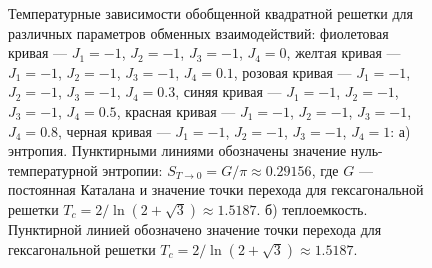 \documentclass[utf8,12pt]{jetp}
\begin{document}
\begin{figure}[h]
	\begin{minipage}[h]{0.5\linewidth}
	\end{minipage}
	\hfill
	\begin{minipage}[h]{0.5\linewidth}
	\end{minipage}
	\caption{Температурные зависимости обобщенной квадратной решетки для различных параметров обменных взаимодействий: фиолетовая кривая --- $J_1 = -1$, $J_2 = -1$, $J_3 = -1$, $J_4 = 0$, желтая кривая --- $J_1 = -1$, $J_2 = -1$, $J_3 = -1$, $J_4 = 0.1$, розовая кривая --- $J_1 = -1$, $J_2 = -1$, $J_3 = -1$, $J_4 = 0.3$, синяя кривая --- $J_1 = -1$, $J_2 = -1$, $J_3 = -1$, $J_4 = 0.5$, красная кривая --- $J_1 = -1$, $J_2 = -1$, $J_3 = -1$, $J_4 = 0.8$, черная кривая --- $J_1 = -1$, $J_2 = -1$, $J_3 = -1$, $J_4 = 1$: а) энтропия. Пунктирными линиями обозначены значение нуль-температурной энтропии: $S_{T\rightarrow 0} = G/\pi\approx 0.29156$, где $G$ --- постоянная Каталана и значение точки перехода для гексагональной решетки $T_c = 2/\ln(2+\sqrt{3})\approx 1.5187$. б) теплоемкость. Пунктирной линией обозначено значение точки перехода для гексагональной решетки $T_c = 2/\ln(2+\sqrt{3})\approx 1.5187$. }
	\label{Peak2}
\end{figure}
\end{document}
